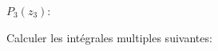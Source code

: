 \begin{enonce}
$P_{3}(z_{3})$:
\end{enonce}
%


\finEntrainement

















\hauteurLargeurCadreReponse		{8mm}{3.5cm}
\initialisationEntrainement





\debutEntrainement
Calculer les intégrales multiples suivantes:

